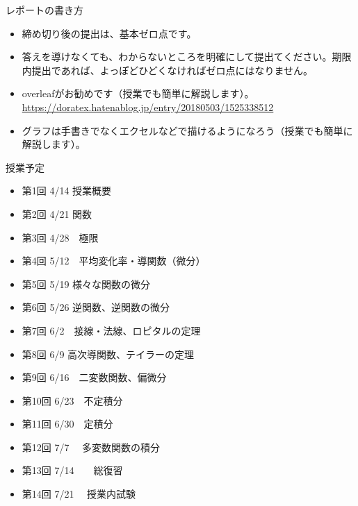 \begin{slide}{レポートの書き方}
\begin{itemize}
\item 締め切り後の提出は、基本ゼロ点です。
\item 答えを導けなくても、わからないところを明確にして提出てください。期限内提出であれば、よっぽどひどくなければゼロ点にはなりません。
\item overleafがお勧めです（授業でも簡単に解説します）。
\url{https://doratex.hatenablog.jp/entry/20180503/1525338512}
\item グラフは手書きでなくエクセルなどで描けるようになろう（授業でも簡単に解説します）。
\end{itemize}

\end{slide}
\begin{slide}{授業予定}
\begin{itemize}
\item 第1回 4/14 授業概要
\item 第2回 4/21	関数
\item 第3回 4/28　極限
\item 第4回 5/12　平均変化率・導関数（微分）
\item 第5回 5/19	様々な関数の微分
\item 第6回 5/26	逆関数、逆関数の微分
\item 第7回 6/2　接線・法線、ロピタルの定理
\item 第8回 6/9	高次導関数、テイラーの定理
\item 第9回 6/16　二変数関数、偏微分
\item 第10回 6/23　不定積分
\item 第11回 6/30　定積分
\item 第12回 7/7 　多変数関数の積分
\item 第13回 7/14　　総復習
\item 第14回 7/21 　授業内試験
\end{itemize}
\end{slide}

